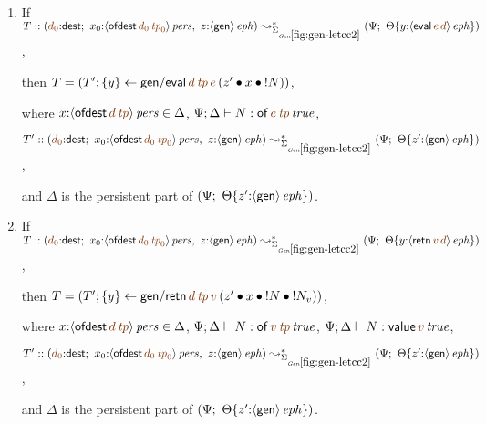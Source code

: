 \begin{lemma} ~
\begin{enumerate}
\item If $T :: \left(\lf{d_0}{:}{\sf dest}; ~ x_0{:}\ispers{\susp{{\sf
          ofdest}\,\lf{d_0}\,\lf{{\it tp}_0}}}, ~ z{:}\iseph{\susp{{\sf
          gen}}}\right) \leadsto^*_{\siggenletcc} \left(\Psi; ~
    \tackon{\Theta}{y{:}\iseph{\susp{{\sf
            eval}\,\lf{e}\,\lf{d}}}}\right)$,

    then $T = (T'; \trstep{y}{{\sf gen/eval}\,\lf{d}\,\lf{{\it tp}}\,\lf{e}\,
      (\tfuser{z'}{\tfuser{x}{\tbangr{N}}})})$,

    where $x{:}\ispers{\susp{{\sf ofdest}\,\lf{d}\,\lf{{\it tp}}}} \in \Delta$,
    $\Psi; \Delta \vdash N : \isconc{{\sf of}\,\lf{e}\,\lf{{\it tp}}}$,
    
    $T' :: \left(\lf{d_0}{:}{\sf dest}; ~ x_0{:}\ispers{\susp{{\sf
          ofdest}\,\lf{d_0}\,\lf{{\it tp}_0}}}, ~ z{:}\iseph{\susp{{\sf
          gen}}}\right) \leadsto^*_{\siggenletcc}
          \left(\Psi; ~ \tackon{\Theta}{z'{:}\iseph{\susp{{\sf gen}}}}\right)$,

    and $\Delta$ is the persistent part of 
    $\left(\Psi; ~ {\Theta}\{{z'{:}{\langle {{\sf gen}} \rangle}\,{{\it eph}}}\}\right)$.

\medskip
\item If $T :: \left(\lf{d_0}{:}{\sf dest}; ~ x_0{:}\ispers{\susp{{\sf
          ofdest}\,\lf{d_0}\,\lf{{\it tp}_0}}}, ~ z{:}\iseph{\susp{{\sf
          gen}}}\right) \leadsto^*_{\siggenletcc} \left(\Psi; ~
    \tackon{\Theta}{y{:}\iseph{\susp{{\sf
            retn}\,\lf{v}\,\lf{d}}}}\right)$,

    then $T = (T'; \trstep{y}{{\sf gen/retn}\,\lf{d}\,\lf{{\it tp}}\,\lf{v}\,
      (\tfuser{z'}{\tfuser{x}{\tfuser{\tbangr{N}}{\tbangr{N_v}}}})})$,

    where $x{:}\ispers{\susp{{\sf ofdest}\,\lf{d}\,\lf{{\it tp}}}} \in \Delta$,
    $\Psi; \Delta \vdash N : \isconc{{\sf of}\,\lf{v}\,\lf{{\it tp}}}$,
    $\Psi; \Delta \vdash N : \isconc{{\sf value}\,\lf{v}}$,
    
    $T' :: \left(\lf{d_0}{:}{\sf dest}; ~ x_0{:}\ispers{\susp{{\sf
          ofdest}\,\lf{d_0}\,\lf{{\it tp}_0}}}, ~ z{:}\iseph{\susp{{\sf
          gen}}}\right) \leadsto^*_{\siggenletcc}
          \left(\Psi; ~ \tackon{\Theta}{z'{:}\iseph{\susp{{\sf gen}}}}\right)$,

    and $\Delta$ is the persistent part of 
    $\left(\Psi; ~ {\Theta}\{{z'{:}{\langle {{\sf gen}} \rangle}\,{{\it eph}}}\}\right)$.



\end{enumerate}
\end{lemma}
